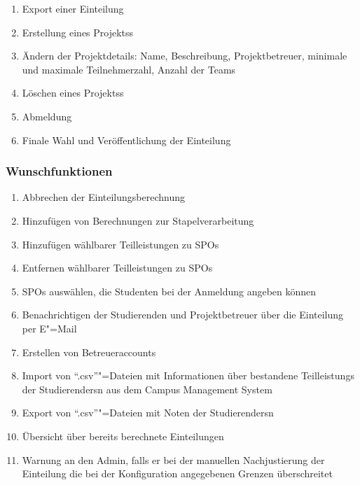 \documentclass[parskip=full]{scrartcl}
\newcommand{\swtLabel}[1]{\textbf{/#1\arabic*0/}}
\begin{document}
\begin{enumerate}[label=\swtLabel{FA}, resume]
  \item Export einer Einteilung \label{FAexport}
  \item Erstellung eines \glspl{Projekt}s \label{FAadmin+projekt}
  \item Ändern der Projektdetails: Name, Beschreibung, Projektbetreuer, %
        minimale und maximale Teilnehmerzahl, Anzahl der Teams
        \label{FAadminProjektänderung}
  \item Löschen eines \glspl{Projekt}s \label{FAadmin-Projekt}
  \item Abmeldung \label{FAadminAbmeldung}
  \item Finale Wahl und Veröffentlichung der Einteilung \label{FAadminAuswahl}
\end{enumerate}

\subsubsection{Wunschfunktionen}

\begin{enumerate}[label=\swtLabel{FA}, resume]
  \item Abbrechen der Einteilungsberechnung \label{FAabbruch}
  \item Hinzufügen von Berechnungen zur Stapelverarbeitung \label{FAadminStapel}
  \item Hinzufügen wählbarer Teilleistungen zu \glspl{SPO} \label{FAadminSPOhinzufügen}
  \item Entfernen wählbarer Teilleistungen zu \glspl{SPO} \label{FAadminSPOentfernen}
  \item \glspl{SPO} auswählen, die Studenten bei der Anmeldung angeben können 
  \item Benachrichtigen der Studierenden und Projektbetreuer über die Einteilung
  per E"=Mail \label{FAadminBenachrichtigen}
  \item Erstellen von Betreueraccounts \label{FAadminCreateAccounts}
  \item Import von \enquote{.csv}"=Dateien mit Informationen über bestandene
  \glspl{Teilleistung} der \glspl{Studierender}n aus dem Campus Management System 
  \label{FAimport2}
  \item Export von \enquote{.csv}"=Dateien mit Noten der \glspl{Studierender}n
  \label{FAexport2}
  \item Übersicht über bereits berechnete Einteilungen
  \item Warnung an den \gls{Admin}, falls er bei der manuellen Nachjustierung 
  der Einteilung die bei der Konfiguration angegebenen Grenzen überschreitet
\end{enumerate}
\end{document}
